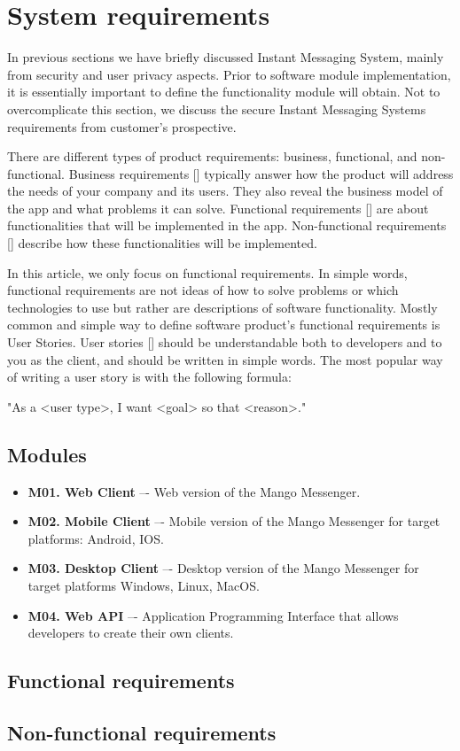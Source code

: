\chapter{System requirements}\label{ch:system-requirements}

In previous sections we have briefly discussed Instant Messaging System, mainly from security and user privacy aspects.
Prior to software module implementation, it is essentially important to define the functionality module will obtain.
Not to overcomplicate this section, we discuss the secure Instant Messaging Systems requirements from customer's prospective.

There are different types of product requirements: business, functional, and non-functional.
Business requirements [\cite{dilworth2007creation}] typically answer how the product will address the needs of your company and its users.
They also reveal the business model of the app and what problems it can solve.
Functional requirements [\cite{malan2001functional}] are about functionalities that will be implemented in the app.
Non-functional requirements [\cite{chung2012non}] describe how these functionalities will be implemented.

In this article, we only focus on functional requirements.
In simple words, functional requirements are not ideas of how to solve problems or which technologies to use but rather
are descriptions of software functionality.
Mostly common and simple way to define software product's functional requirements is User Stories.
User stories [\cite{cohn2004user}] should be understandable both to developers and to you as the client, and should be written in simple words.
The most popular way of writing a user story is with the following formula:

\begin{center}
    "As a <user type>, I want <goal> so that <reason>."
\end{center}


\section{Modules}\label{sec:modules}
\begin{itemize}
    \item \textbf{M01. Web Client} –- Web version of the Mango Messenger.
    \item \textbf{M02. Mobile Client} –- Mobile version of the Mango Messenger for target platforms: Android, IOS\@.
    \item \textbf{M03. Desktop Client} –- Desktop version of the Mango Messenger for target platforms Windows, Linux, MacOS\@.
    \item \textbf{M04. Web API} –- Application Programming Interface that allows developers to create their own clients.
\end{itemize}


\section{Functional requirements}\label{sec:functional-requirements}



\section{Non-functional requirements}\label{sec:non-functional-requirements}

